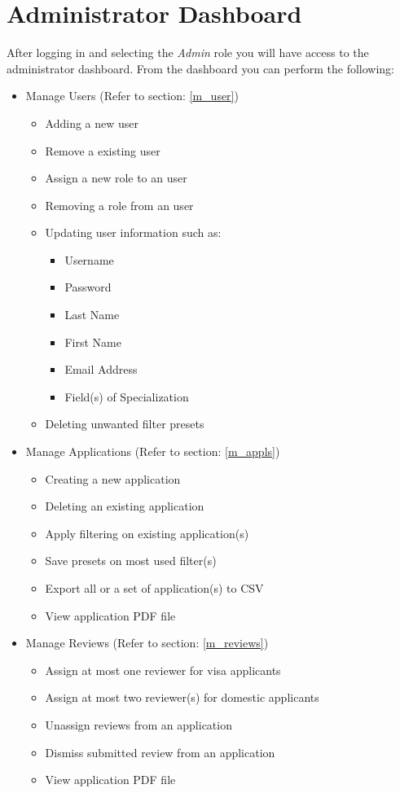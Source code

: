 \documentclass[fontsize=12pt,paper=letter,twoside]{scrartcl}
\begin{document}
\clearpage
\section{Administrator Dashboard}

After logging in and selecting the \emph{Admin} role you will have access to the administrator dashboard. From the dashboard you can perform the following:
\begin{itemize}
\item Manage Users (Refer to section: \ref{m_user})
\begin{itemize}
\item Adding a new user
\item Remove a existing user
\item Assign a new role to an user
\item Removing a role from an user
\item Updating user information such as:
\begin{itemize}
\item Username
\item Password
\item Last Name
\item First Name
\item Email Address
\item Field(s) of Specialization
\end{itemize}
\item Deleting unwanted filter presets
\end{itemize}
\item Manage Applications (Refer to section: \ref{m_appls})
\begin{itemize}
\item Creating a new application
\item Deleting an existing application
\item Apply filtering on existing application(s)
\item Save presets on most used filter(s)
\item Export all or a set of application(s) to CSV
\item View application PDF file
\end{itemize}
\item Manage Reviews (Refer to section: \ref{m_reviews})
\begin{itemize}
\item Assign at most one reviewer for visa applicants
\item Assign at most two reviewer(s) for domestic applicants
\item Unassign reviews from an application
\item Dismiss submitted review from an application
\item View application PDF file
\end{itemize}
\end{itemize} 
\end{document}
